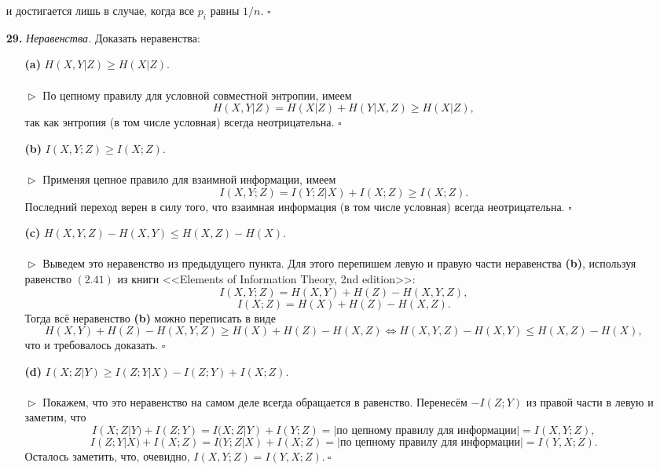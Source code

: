 \documentclass{article}
\renewcommand{\ge}{\geqslant}
\renewcommand{\le}{\leqslant}
\newcommand{\ds}{\displaystyle}
\begin{document}
\begin{enumerate}
и достигается лишь в случае, когда все $p_i$ равны $1/n$. $\square$
\\
\item[\bfseries 29.] \textit{Неравенства.} Доказать неравенства:
\begin{enumerate}
\item[\bfseries (a)] $H(X, Y | Z) \ge H(X | Z).$
\\\\$\vartriangleright$ По цепному правилу для условной совместной энтропии, имеем 
$$H(X, Y | Z) = H(X | Z) + H(Y|X, Z) \ge H(X|Z),$$
так как энтропия (в том числе условная) всегда неотрицательна. $\square$
\\
\item[\bfseries (b)] $I(X, Y; Z) \ge I(X; Z).$
\\\\$\vartriangleright$ Применяя цепное правило для взаимной информации, имеем
$$I(X, Y; Z) = I(Y; Z | X) + I(X; Z) \ge I(X; Z).$$
Последний переход верен в силу того, что взаимная информация (в том числе условная) всегда неотрицательна. $\square$
\\
\item[\bfseries (c)] $H(X, Y, Z) - H(X, Y) \le H(X, Z) - H(X).$
\\\\$\vartriangleright$ Выведем это неравенство из предыдущего пункта. 
Для этого перепишем левую и правую части неравенства {\bfseries (b)}, используя равенство $(2.41)$ из книги <<Elements of Information Theory, 2nd edition>>:
$$I(X, Y; Z) = H(X, Y) + H(Z) - H(X, Y, Z),$$
$$I(X; Z) = H(X) + H(Z) - H(X, Z).$$
Тогда всё неравенство {\bfseries (b)} можно переписать в виде
$$H(X, Y) + H(Z) - H(X, Y, Z) \ge H(X) + H(Z) - H(X, Z) \Longleftrightarrow H(X, Y, Z) - H(X, Y) \le H(X, Z) - H(X),$$
что и требовалось доказать. $\square$
\\
\item[\bfseries (d)] $I(X; Z | Y) \ge I(Z; Y | X) - I(Z; Y) + I(X; Z).$
\\\\$\vartriangleright$ Покажем, что это неравенство на самом деле всегда обращается в равенство. Перенесём $-I(Z; Y)$ из правой части в левую и заметим, что
$$I(X; Z | Y) + I(Z; Y) = I(X; Z | Y) + I(Y; Z) = |\text{по цепному правилу для информации}| = I(X, Y; Z),$$
$$I(Z; Y | X) + I(X; Z) = I(Y; Z | X) + I(X; Z) = |\text{по цепному правилу для информации}| = I(Y, X; Z).$$
Осталось заметить, что, очевидно, $\ds I(X, Y; Z) = I(Y, X; Z).\ \square$
\\
\end{enumerate}

\end{enumerate}
\end{document}
